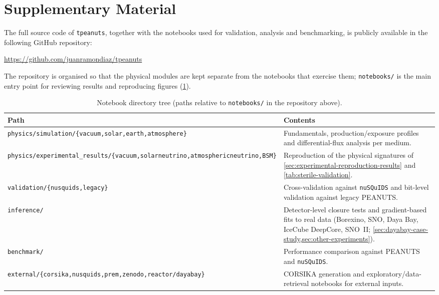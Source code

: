 \section{Supplementary Material}
\label{sec:supplementary-material}

The full source code of \texttt{tpeanuts}, together with the notebooks used for validation, analysis and benchmarking, is publicly available in the following GitHub repository:

\begin{center}
  \url{https://github.com/juanramondiaz/tpeanuts}
\end{center}

The repository is organised so that the physical modules are kept separate from the notebooks that exercise them; \texttt{notebooks/} is the main entry point for reviewing results and reproducing figures (\cref{tab:notebook-tree}).

\begin{table}[htbp]
  \centering
  \footnotesize
  \caption{Notebook directory tree (paths relative to \texttt{notebooks/} in the repository above).}
  \label{tab:notebook-tree}
  \begin{tabularx}{\textwidth}{lX}
    \toprule
    Path & Contents \\
    \midrule
    \texttt{physics/simulation/\{vacuum,solar,earth,atmosphere\}} & Fundamentals, production/exposure profiles and differential-flux analysis per medium. \\
    \texttt{physics/experimental\_results/\{vacuum,solarneutrino,atmosphericneutrino,BSM\}} & Reproduction of the physical signatures of \cref{sec:experimental-reproduction-results} and \cref{tab:sterile-validation}. \\
    \texttt{validation/\{nusquids,legacy\}} & Cross-validation against \texttt{nuSQuIDS} and bit-level validation against legacy PEANUTS. \\
    \texttt{inference/} & Detector-level closure tests and gradient-based fits to real data (Borexino, SNO, Daya Bay, IceCube DeepCore, SNO~II; \cref{sec:dayabay-case-study,sec:other-experiments}). \\
    \texttt{benchmark/} & Performance comparison against PEANUTS and \texttt{nuSQuIDS}. \\
    \texttt{external/\{corsika,nusquids,prem,zenodo,reactor/dayabay\}} & CORSIKA generation and exploratory/data-retrieval notebooks for external inputs. \\
    \bottomrule
  \end{tabularx}
\end{table}

